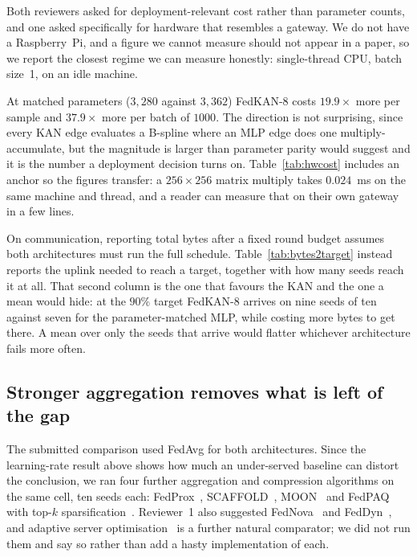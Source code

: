 Both reviewers asked for deployment-relevant cost rather than parameter counts, and one asked
specifically for hardware that resembles a gateway. We do not have a Raspberry~Pi, and a figure
we cannot measure should not appear in a paper, so we report the closest regime we can measure
honestly: single-thread CPU, batch size~1, on an idle machine.



At matched parameters ($3{,}280$ against $3{,}362$) FedKAN-8 costs $19.9\times$ more per sample
and $37.9\times$ more per batch of $1000$. The direction is not surprising, since every KAN edge
evaluates a B-spline where an MLP edge does one multiply-accumulate, but the magnitude is larger
than parameter parity would suggest and it is the number a deployment decision turns on.
Table~\ref{tab:hwcost} includes an anchor so the figures transfer: a $256\times256$ matrix
multiply takes $0.024$~ms on the same machine and thread, and a reader can measure that on their
own gateway in a few lines.



On communication, reporting total bytes after a fixed round budget assumes both architectures
must run the full schedule. Table~\ref{tab:bytes2target} instead reports the uplink needed to
reach a target, together with how many seeds reach it at all. That second column is the one that
favours the KAN and the one a mean would hide: at the $90\%$ target FedKAN-8 arrives on nine
seeds of ten against seven for the parameter-matched MLP, while costing more bytes to get there.
A mean over only the seeds that arrive would flatter whichever architecture fails more often.

\subsection{Stronger aggregation removes what is left of the gap}\label{sec:algos}

The submitted comparison used FedAvg for both architectures. Since the learning-rate result
above shows how much an under-served baseline can distort the conclusion, we ran four further aggregation and compression algorithms on the same cell, ten seeds each: FedProx~\cite{li2020fedprox}, SCAFFOLD~\cite{karimireddy2020scaffold}, MOON~\cite{li2021moon} and FedPAQ~\cite{reisizadeh2020fedpaq} with top-$k$ sparsification~\cite{aji2017topk}. Reviewer~1 also suggested FedNova~\cite{wang2020fednova} and FedDyn~\cite{acar2021feddyn}, and adaptive server optimisation~\cite{reddi2021adaptive} is a further natural comparator; we did not run them and say so rather than add a hasty implementation of each.

